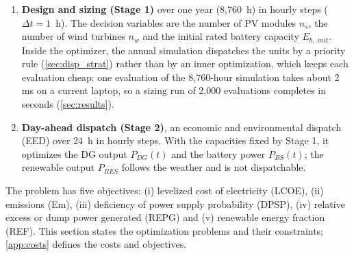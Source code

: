 \documentclass[final,3p,times]{elsarticle}
\begin{document}
\begin{enumerate}
    \item \textbf{Design and sizing (Stage 1)} over one year (8,760~h) in hourly steps ($\Delta t = 1$~h). The decision variables are the number of PV modules $n_s$, the number of wind turbines $n_w$ and the initial rated battery capacity $E_{b,\;init}$. Inside the optimizer, the annual simulation dispatches the units by a priority rule (\cref{sec:disp_strat}) rather than by an inner optimization, which keeps each evaluation cheap: one evaluation of the 8,760-hour simulation takes about 2\,ms on a current laptop, so a sizing run of 2,000 evaluations completes in seconds (\cref{sec:results}).
    \item \textbf{Day-ahead dispatch (Stage 2)}, an economic and environmental dispatch (EED) over 24~h in hourly steps. With the capacities fixed by Stage 1, it optimizes the DG output $P_{DG}(t)$ and the battery power $P_{BS}(t)$; the renewable output $P_{RES}$ follows the weather and is not dispatchable.
\end{enumerate}

The problem has five objectives: (i) levelized cost of electricity (LCOE), (ii) emissions (Em), (iii) deficiency of power supply probability (DPSP), (iv) relative excess or dump power generated (REPG) and (v) renewable energy fraction (REF). This section states the optimization problems and their constraints; \cref{app:costs} defines the costs and objectives.
\end{document}
